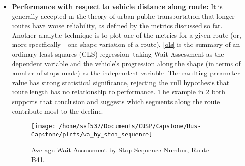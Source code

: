 \documentclass[12pt]{report}
\begin{document}
\begin{itemize}
One example descriptive analysis is to plot the distribution of normalized running time variances. Visible in this example, \ref{adh}, is both the central tendency -- slightly positive -- and the wide spread of the distribution, indicating very inconsistent running time adherence.  Strategies to reduce the inconsistency are not in the scope of this project.




\begin{figure}[!ht]
  \caption{Running time adherence.}
  \label{adh}
  \centering
    \texttt{[image: /home/saf537/Documents/CUSP/Capstone/Bus-Capstone/plots/running\_time\_adherence]}
\end{figure}


\item \textbf{Performance with respect to vehicle distance along route:} It is generally accepted in the theory of urban public transportation that longer routes have worse reliability, as defined by the metrics discussed so far.  Another analytic technique is to plot one of the metrics for a given route (or, more specifically - one shape variation of a route).  \ref{ols} is the summary of an ordinary least squares (OLS) regression, taking Wait Assessment as the dependent variable and the vehicle's progression along the shape (in terms of number of stops made) as the independent variable.  The resulting parameter value has strong statistical significance, rejecting the null hypothesis that route length has no relationship to performance.  The example in \ref{wastop} both supports that conclusion and suggests which segments along the route contribute most to the decline.



\begin{figure}[!ht]
  \caption{Average Wait Assessment by Stop Sequence Number, Route B41.}
  \label{wastop}
  \centering
    \texttt{[image: /home/saf537/Documents/CUSP/Capstone/Bus-Capstone/plots/wa\_by\_stop\_sequence]}
\end{figure}


\end{itemize}
\end{document}
